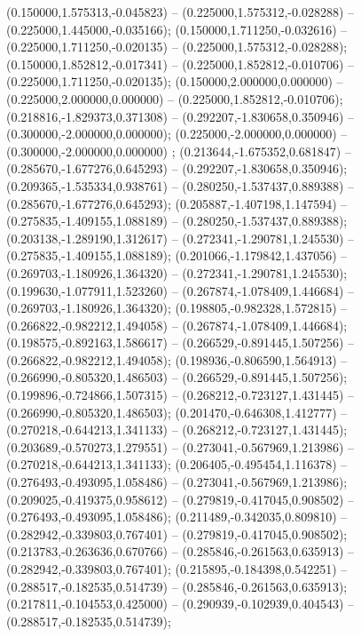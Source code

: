  (0.150000,1.575313,-0.045823) -- (0.225000,1.575312,-0.028288) -- (0.225000,1.445000,-0.035166);
 (0.150000,1.711250,-0.032616) -- (0.225000,1.711250,-0.020135) -- (0.225000,1.575312,-0.028288);
 (0.150000,1.852812,-0.017341) -- (0.225000,1.852812,-0.010706) -- (0.225000,1.711250,-0.020135);
 (0.150000,2.000000,0.000000) -- (0.225000,2.000000,0.000000) -- (0.225000,1.852812,-0.010706);
 (0.218816,-1.829373,0.371308) -- (0.292207,-1.830658,0.350946) -- (0.300000,-2.000000,0.000000);
 (0.225000,-2.000000,0.000000) -- (0.300000,-2.000000,0.000000) ;
 (0.213644,-1.675352,0.681847) -- (0.285670,-1.677276,0.645293) -- (0.292207,-1.830658,0.350946);
 (0.209365,-1.535334,0.938761) -- (0.280250,-1.537437,0.889388) -- (0.285670,-1.677276,0.645293);
 (0.205887,-1.407198,1.147594) -- (0.275835,-1.409155,1.088189) -- (0.280250,-1.537437,0.889388);
 (0.203138,-1.289190,1.312617) -- (0.272341,-1.290781,1.245530) -- (0.275835,-1.409155,1.088189);
 (0.201066,-1.179842,1.437056) -- (0.269703,-1.180926,1.364320) -- (0.272341,-1.290781,1.245530);
 (0.199630,-1.077911,1.523260) -- (0.267874,-1.078409,1.446684) -- (0.269703,-1.180926,1.364320);
 (0.198805,-0.982328,1.572815) -- (0.266822,-0.982212,1.494058) -- (0.267874,-1.078409,1.446684);
 (0.198575,-0.892163,1.586617) -- (0.266529,-0.891445,1.507256) -- (0.266822,-0.982212,1.494058);
 (0.198936,-0.806590,1.564913) -- (0.266990,-0.805320,1.486503) -- (0.266529,-0.891445,1.507256);
 (0.199896,-0.724866,1.507315) -- (0.268212,-0.723127,1.431445) -- (0.266990,-0.805320,1.486503);
 (0.201470,-0.646308,1.412777) -- (0.270218,-0.644213,1.341133) -- (0.268212,-0.723127,1.431445);
 (0.203689,-0.570273,1.279551) -- (0.273041,-0.567969,1.213986) -- (0.270218,-0.644213,1.341133);
 (0.206405,-0.495454,1.116378) -- (0.276493,-0.493095,1.058486) -- (0.273041,-0.567969,1.213986);
 (0.209025,-0.419375,0.958612) -- (0.279819,-0.417045,0.908502) -- (0.276493,-0.493095,1.058486);
 (0.211489,-0.342035,0.809810) -- (0.282942,-0.339803,0.767401) -- (0.279819,-0.417045,0.908502);
 (0.213783,-0.263636,0.670766) -- (0.285846,-0.261563,0.635913) -- (0.282942,-0.339803,0.767401);
 (0.215895,-0.184398,0.542251) -- (0.288517,-0.182535,0.514739) -- (0.285846,-0.261563,0.635913);
 (0.217811,-0.104553,0.425000) -- (0.290939,-0.102939,0.404543) -- (0.288517,-0.182535,0.514739);
